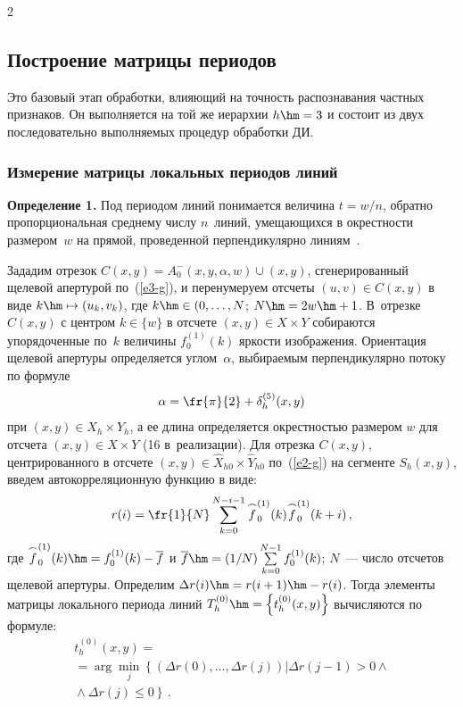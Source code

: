 \begin{multicols}{2}
\addtocounter{figure}{1}


  

\subsection{Построение матрицы периодов} %

  Это базовый этап обработки, влияющий на точность распознавания частных 
признаков. Он выполняется на той же иерархии $h\hm=3$ и состоит из двух 
последовательно выполняемых процедур обработки ДИ.
  
  \subsubsection*{Измерение матрицы локальных периодов линий}
  
  \noindent
  \textbf{Определение 1.} Под периодом линий понимается величина $t=w/n$, 
обратно пропорциональная среднему числу $n$~линий, умещающихся в 
окрестности размером~$w$ на прямой, проведенной перпендикулярно 
линиям~\cite{1-g}.
  
  Зададим отрезок $C(x,y)=A_0^- (x,y,\alpha,w)\cup(x,y)$, сгенерированный 
щелевой апертурой по~(\ref{e3-g}), и перенумеруем отсчеты $(u,v)\in C(x,y)$ в 
виде $k\hm\mapsto (u_k,v_k)$, где $k\hm\in(0,\ldots  , N$; $N\hm=2w\hm+1$. В~отрезке 
$C(x,y)$ с центром $k\in \{w\}$ в отсчете $(x,y)\in X\times Y$ собираются 
упорядоченные по~$k$ величины $f_0^{(1)}(k)$ яркости изображения. 
Ориентация щелевой апертуры определяется углом~$\alpha$, выбираемым 
перпендикулярно потоку по формуле
  $$
  \alpha =\fr{\pi}{2}+\delta_h^{(5)}(x,y)
  $$
при $(x,y)\in X_h\times Y_h$, а ее длина определяется окрестностью размером 
$w$ для отсчета $(x,y)\in X\times Y$ (16 в~реализации). Для отрезка $C(x,y)$, 
центрированного в отсчете $(x,y)\in \hat{X}_{h0}\times \hat{Y}_{h0}$ 
по~(\ref{e2-g}) на сегменте $S_h(x,y)$, введем автокорреляционную функцию в 
виде:
\begin{equation}
r(i) =\fr{1}{N}\sum\limits_{k=0}^{N-i-1} \overset{\frown}{f}_0^{(1)}(k) 
\overset{\frown}{f}_0^{(1)}(k+i)\,,
\label{e13-g}
\end{equation}
где $\overset{\frown}{f}_0^{(1)}(k)\hm= f_0^{(1)}(k)-\overline{f}$ и 
$\overline{f} \hm= (1/N) \sum\limits_{k=0}^{N-1} f_0^{(1)}(k)$;  $N$~--- чис\-ло 
отсчетов щелевой апертуры. Определим $\Delta r(i) \hm= r(i+1)\hm-
r(i)$. Тогда элементы матрицы локального периода линий $T_h^{(0)}\hm=\left\{ 
t_h^{(0)}(x,y)\right\}$ вычисляются по формуле:
\begin{multline}
t_h^{(0)} (x,y)={}\\
{}=\arg \min\limits_j \left\{ \left( \Delta r(0),\ldots , \Delta r(j)\right) 
\vert \Delta r(j-1)>0 \wedge{}\right.\\
\left.{}\wedge \Delta r(j)\leq 0\right\}\,.
\label{e14-g}
\end{multline}
  

\end{multicols}
